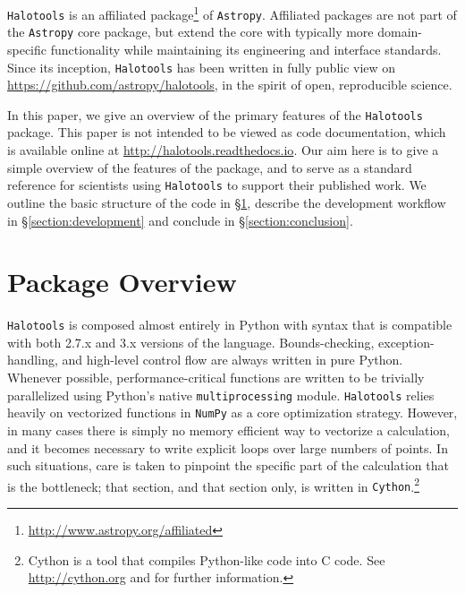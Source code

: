 \documentclass[twocolumn, tighten]{aastex6}
\begin{document}
{\tt Halotools} is an affiliated package\footnote{\url{http://www.astropy.org/affiliated}} of {\tt Astropy}. Affiliated packages are not part of the {\tt Astropy} core package, but extend the core with typically more domain-specific functionality while maintaining its engineering and interface standards. Since its inception, {\tt Halotools} has been written in fully public view on {\url{https://github.com/astropy/halotools}}, in the spirit of open, reproducible science.

In this paper, we give an overview of the primary features of the {\tt Halotools} package. This paper is not intended to be viewed as code documentation, which is available online at {\url{http://halotools.readthedocs.io}}. Our aim here is to give a simple overview of the features of the package, and to serve as a standard reference for scientists using {\tt Halotools} to support their published work. We outline the basic structure of the code in \S\ref{section:overview}, describe the development workflow in \S\ref{section:development} and conclude in \S\ref{section:conclusion}.

\section{Package Overview}
\label{section:overview}

{\tt Halotools} is composed almost entirely in Python with syntax that is compatible with both 2.7.x and 3.x versions of the language. Bounds-checking, exception-handling, and high-level control flow are always written in pure Python. Whenever possible, performance-critical functions are written to be trivially parallelized using Python's native {\tt multiprocessing} module. {\tt Halotools} relies heavily on vectorized functions in {\tt NumPy} as a core optimization strategy. However, in many cases there is simply no memory efficient way to vectorize a calculation, and it becomes necessary to write explicit loops over large numbers of points. In such situations, care is taken to pinpoint the specific part of the calculation that is the bottleneck; that section, and that section only, is written in {\tt Cython}.\footnote{Cython is a tool that compiles Python-like code into C code. See \url{http://cython.org} and \citet{cython} for further information.}
\end{document}
